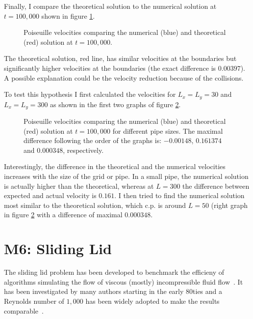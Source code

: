 Finally, I compare the theoretical solution to the numerical solution at $t=100,000$ shown in figure \ref{fig:m5-1-num-theo}.
\begin{figure}[ht]
\centering
\resizebox{0.6\columnwidth}{!}{\large}
\caption[Poiseuille numerical vs analytical]{Poiseuille velocities comparing the numerical (blue) and theoretical (red) solution at $t=100,000$.}
\label{fig:m5-1-num-theo}
\end{figure}
The theoretical solution, red line, has similar velocities at the boundaries but significantly higher velocities at the boundaries (the exact difference is $0.00397$).
A possible explanation could be the velocity reduction because of the collisions.

To test this hypothesis I first calculated the velocities for $L_x=L_y=30$ and $L_x=L_y=300$ as shown in the first two graphs of figure \ref{fig:m5-1-num-theo-extended}.
\begin{figure}[ht]
\centering
\resizebox{\columnwidth}{!}{\large}
\caption[Poiseuille analysis extended]{Poiseuille velocities comparing the numerical (blue) and theoretical (red) solution at $t=100,000$ for different pipe sizes. The maximal difference following the order of the graphs is: $-0.00148$, $0.161374$ and $0.000348$, respectively.}
\label{fig:m5-1-num-theo-extended}
\end{figure}
Interestingly, the difference in the theoretical and the numerical velocities increases with the size of the grid or pipe. In a small pipe, the numerical solution is actually higher than the theoretical, whereas at $L=300$ the difference between expected and actual velocity is $0.161$. 
I then tried to find the numerical solution most similar to the theoretical solution, which c.p. is around $L=50$ (right graph in figure \ref{fig:m5-1-num-theo-extended} with a difference of maximal $0.000348$.


\section{M6: Sliding Lid}
The sliding lid problem has been developed to benchmark the efficieny of algorithms simulating the flow of viscous (mostly) incompressible fluid flow~\cite{bruneau20062-lid-cavity}.
It has been investigated by many authors starting in the early 80ties and a Reynolds number of $1,000$ has been widely adopted to make the results comparable~\cite{bruneau20062-lid-cavity}.

